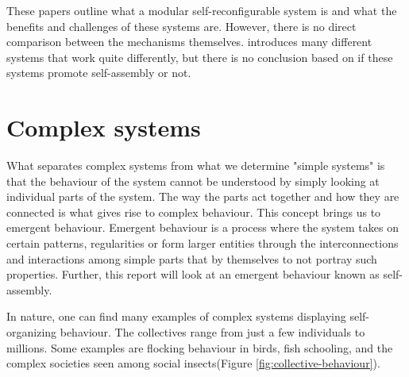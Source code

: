 These papers outline what a modular self-reconfigurable system is and what the benefits and challenges of these systems are.
However, there is no direct comparison between the mechanisms themselves.
\cite{yim_modular_2007} introduces many different systems that work quite differently, but there is no conclusion based on if these systems promote self-assembly or not.

\section{Complex systems}
\label{sec:complex_systems}
What separates complex systems from what we determine "simple systems" is that the behaviour of the system cannot be understood by simply looking at individual parts of the system.
The way the parts act together and how they are connected is what gives rise to complex behaviour.
This concept brings us to emergent behaviour.
Emergent behaviour is a process where the system takes on certain patterns, regularities or form larger entities through the interconnections and interactions among simple parts that by themselves to not portray such properties.
Further, this report will look at an emergent behaviour known as self-assembly.  

In nature, one can find many examples of complex systems displaying self-organizing behaviour.
The collectives range from just a few individuals to millions.
Some examples are flocking behaviour in birds, fish schooling, and the complex societies seen among social insects(Figure \ref{fig:collective-behaviour}). 

